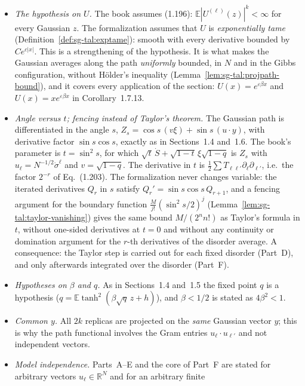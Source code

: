 \begin{remark}
\label{rem:sg-tal:dev-17}
\begin{itemize}
\item \emph{The hypothesis on $U$.}  The book assumes (1.196): $\mathbb E|U^{(\ell)}(z)|^k<\infty$ for every Gaussian $z$.
  The formalization assumes that $U$ is \emph{exponentially tame} (Definition~\ref{def:sg-tal:exptame}): smooth with every derivative bounded by
  $Ce^{c|x|}$.  This is a strengthening of the hypothesis.  It is what makes the Gaussian averages along the path
  \emph{uniformly} bounded, in $N$ and in the Gibbs configuration, without H\"older's inequality (Lemma~\ref{lem:sg-tal:projpath-bound}),
  and it covers every application of the section: $U(x)=e^{\varepsilon\beta x}$ and $U(x)=xe^{\varepsilon\beta x}$
  in Corollary~1.7.13.
\item \emph{Angle versus $t$; fencing instead of Taylor's theorem.}  The Gaussian path is differentiated in the angle $s$,
  $Z_s=\cos s\,(v\xi)+\sin s\,(u\cdot y)$, with derivative factor $\sin s\cos s$, exactly as in Sections~1.4 and~1.6.  The book's
  parameter is $t=\sin^2 s$, for which $\sqrt t\,\dot S+\sqrt{1-t}\,\xi\sqrt{1-q}$ is $Z_s$ with $u_{\ell}=N^{-1/2}\dot\sigma^{\ell}$ and
  $v=\sqrt{1-q}$.  The derivative in $t$ is $\frac12\sum T_{\ell\ell'}\partial_\ell\partial_{\ell'}$, i.e.\ the factor $2^{-r}$ of
  Eq.~(1.203).  The formalization never changes variable: the iterated derivatives $Q_r$ in $s$ satisfy $Q_r'=\sin s\cos s\,Q_{r+1}$, and a
  fencing argument for the boundary function $\frac{M}{j!}(\sin^2s/2)^j$ (Lemma~\ref{lem:sg-tal:taylor-vanishing}) gives the same bound $M/(2^nn!)$ as Taylor's formula in $t$,
  without one-sided derivatives at $t=0$ and without any continuity or domination argument for the $r$-th derivatives of the disorder average.
  A consequence: the Taylor step is carried out for each fixed disorder (Part~D), and only afterwards integrated over the disorder (Part~F).
\item \emph{Hypotheses on $\beta$ and $q$.}  As in Sections~1.4 and~1.5 the fixed point $q$ is a hypothesis
  ($q=\mathbb E\tanh^2(\beta\sqrt q\,z+h)$), and $\beta<1/2$ is stated as $4\beta^2<1$.
\item \emph{Common $y$.}  All $2k$ replicas are projected on the \emph{same} Gaussian vector $y$; this is why the path functional
  involves the Gram entries $u_\ell\cdot u_{\ell'}$ and not independent vectors.
\item \emph{Model independence.}  Parts~A--E and the core of Part~F are stated for arbitrary vectors $u_\ell\in\mathbb R^N$ and for an arbitrary finite

\end{itemize}
\end{remark}
